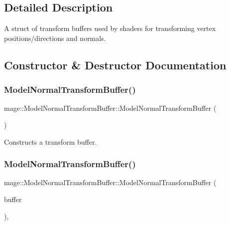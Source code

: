 \subsection{Detailed Description}
A struct of transform buffers used by shaders for transforming vertex positions/directions and normals. 

\subsection{Constructor \& Destructor Documentation}
\hypertarget{structmage_1_1_model_normal_transform_buffer_a04ff9f7d8da77cc7089fa1cd1ae2e2ff}{}\label{structmage_1_1_model_normal_transform_buffer_a04ff9f7d8da77cc7089fa1cd1ae2e2ff} 
\subsubsection{\texorpdfstring{Model\+Normal\+Transform\+Buffer()}{ModelNormalTransformBuffer()}\hspace{0.1cm}{\footnotesize\ttfamily [1/3]}}
{\footnotesize\ttfamily mage\+::\+Model\+Normal\+Transform\+Buffer\+::\+Model\+Normal\+Transform\+Buffer (\begin{DoxyParamCaption}{ }\end{DoxyParamCaption})\hspace{0.3cm}{\ttfamily [noexcept]}}

Constructs a transform buffer. \hypertarget{structmage_1_1_model_normal_transform_buffer_a3e8cbbf4816f6b60f7ed346e7bbed752}{}\label{structmage_1_1_model_normal_transform_buffer_a3e8cbbf4816f6b60f7ed346e7bbed752} 
\subsubsection{\texorpdfstring{Model\+Normal\+Transform\+Buffer()}{ModelNormalTransformBuffer()}\hspace{0.1cm}{\footnotesize\ttfamily [2/3]}}
{\footnotesize\ttfamily mage\+::\+Model\+Normal\+Transform\+Buffer\+::\+Model\+Normal\+Transform\+Buffer (\begin{DoxyParamCaption}\item[{const \hyperlink{structmage_1_1_model_normal_transform_buffer}{Model\+Normal\+Transform\+Buffer} \&}]{buffer }\end{DoxyParamCaption})\hspace{0.3cm}{\ttfamily [default]}, {\ttfamily [noexcept]}}

